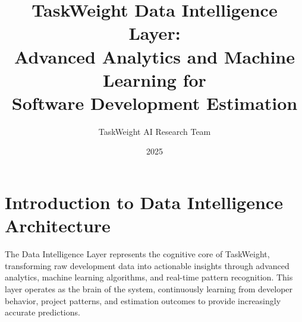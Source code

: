 \documentclass[12pt,a4paper]{article}
\title{\textbf{TaskWeight Data Intelligence Layer:\\Advanced Analytics and Machine Learning for\\Software Development Estimation}}
\author{TaskWeight AI Research Team}
\date{2025}
\begin{document}
\maketitle

\tableofcontents
\newpage

\section{Introduction to Data Intelligence Architecture}

The Data Intelligence Layer represents the cognitive core of TaskWeight, transforming raw development data into actionable insights through advanced analytics, machine learning algorithms, and real-time pattern recognition. This layer operates as the brain of the system, continuously learning from developer behavior, project patterns, and estimation outcomes to provide increasingly accurate predictions.
\end{document}
